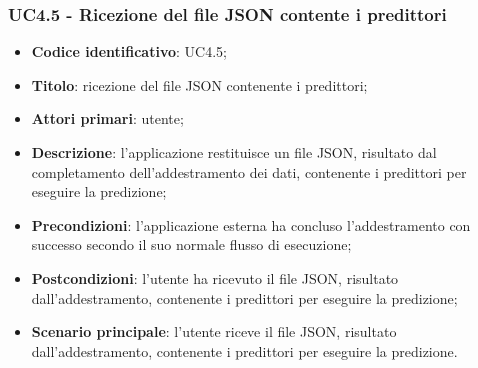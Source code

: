 \subsubsection{UC4.5 - Ricezione del file JSON contente i predittori}
\begin{itemize}
    \item \textbf{Codice identificativo}: UC4.5;
    \item \textbf{Titolo}: ricezione del file JSON contenente i predittori;
    \item \textbf{Attori primari}: utente;
    \item \textbf{Descrizione}: l'applicazione restituisce un file JSON, risultato dal completamento dell'addestramento dei dati, contenente i predittori per eseguire la predizione;
    \item \textbf{Precondizioni}: l'applicazione esterna ha concluso l'addestramento con successo secondo il suo normale flusso di esecuzione;
    \item \textbf{Postcondizioni}: l'utente ha ricevuto il file JSON, risultato dall'addestramento, contenente i predittori per eseguire la predizione;
    \item \textbf{Scenario principale}: l'utente riceve il file JSON, risultato dall'addestramento, contenente i predittori per eseguire la predizione.
\end{itemize}